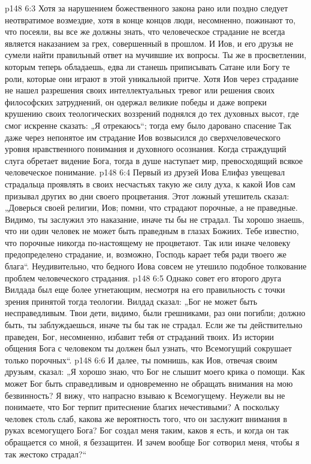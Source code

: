 \vs p148 6:3 Хотя за нарушением божественного закона рано или поздно следует неотвратимое возмездие, хотя в конце концов люди, несомненно, пожинают то, что посеяли, вы все же должны знать, что человеческое страдание не всегда является наказанием за грех, совершенный в прошлом. И Иов, и его друзья не сумели найти правильный ответ на мучившие их вопросы. Ты же в просветлении, которым теперь обладаешь, едва ли станешь приписывать Сатане или Богу те роли, которые они играют в этой уникальной притче. Хотя Иов через страдание не нашел разрешения своих интеллектуальных тревог или решения своих философских затруднений, он одержал великие победы и даже вопреки крушению своих теологических воззрений поднялся до тех духовных высот, где смог искренне сказать: „Я отрекаюсь“; тогда ему было даровано спасение  Так даже через непонятое им страдание Иов возвысился до сверхчеловеческого уровня нравственного понимания и духовного осознания. Когда страждущий слуга обретает видение Бога, тогда в душе наступает мир, превосходящий всякое человеческое понимание.
\vs p148 6:4 Первый из друзей Иова Елифаз увещевал страдальца проявлять в своих несчастьях такую же силу духа, к какой Иов сам призывал других во дни своего процветания. Этот ложный утешитель сказал: „Доверься своей религии, Иов; помни, что страдают порочные, а не праведные. Видимо, ты заслужил это наказание, иначе ты бы не страдал. Ты хорошо знаешь, что ни один человек не может быть праведным в глазах Божиих. Тебе известно, что порочные никогда по\hyp{}настоящему не процветают. Так или иначе человеку предопределено страдание, и, возможно, Господь карает тебя ради твоего же блага“. Неудивительно, что бедного Иова совсем не утешило подобное толкование проблем человеческого страдания.
\vs p148 6:5 Однако совет его второго друга Вилдада был еще более угнетающим, несмотря на его правильность с точки зрения принятой тогда теологии. Вилдад сказал: „Бог не может быть несправедливым. Твои дети, видимо, были грешниками, раз они погибли; должно быть, ты заблуждаешься, иначе ты бы так не страдал. Если же ты действительно праведен, Бог, несомненно, избавит тебя от страданий твоих. Из истории общения Бога с человеком ты должен был узнать, что Всемогущий сокрушает только порочных“.
\vs p148 6:6 И далее, ты помнишь, как Иов, отвечая своим друзьям, сказал: „Я хорошо знаю, что Бог не слышит моего крика о помощи. Как может Бог быть справедливым и одновременно не обращать внимания на мою безвинность? Я вижу, что напрасно взываю к Всемогущему. Неужели вы не понимаете, что Бог терпит притеснение благих нечестивыми? А поскольку человек столь слаб, какова же вероятность того, что он заслужит внимания в руках всемогущего Бога? Бог создал меня таким, каков я есть, и когда он так обращается со мной, я беззащитен. И зачем вообще Бог сотворил меня, чтобы я так жестоко страдал?“
